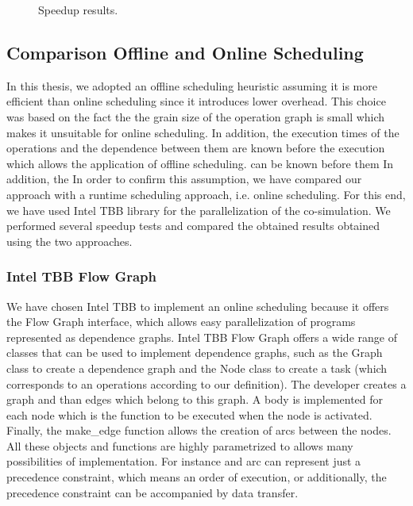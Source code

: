 \begin{figure}[phbt]
\centering

\caption{Speedup results.}
\label{fig:spdup}
\end{figure}  

\subsection{Comparison Offline and Online Scheduling}

In this thesis, we adopted an offline scheduling heuristic assuming it is more efficient than online scheduling since it introduces lower overhead. This choice was based on the fact the the grain size of the operation graph is small which makes it unsuitable for online scheduling. In addition, the execution times of the operations and the dependence between them are known before the execution which allows the application of offline scheduling. can be known before them In addition, the In order to confirm this assumption, we have compared our approach with a runtime scheduling approach, i.e. online scheduling. For this end, we have used Intel TBB library for the parallelization of the co-simulation. We performed several speedup tests and compared the obtained results obtained using the two approaches.

\subsubsection{Intel TBB Flow Graph}

We have chosen Intel TBB to implement an online scheduling because it offers the Flow Graph interface, which allows easy parallelization of programs represented as dependence graphs. Intel TBB Flow Graph offers a wide range of classes that can be used to implement dependence graphs, such as the Graph class to create a dependence graph and the Node class to create a task (which corresponds to an operations according to our definition). The developer creates a graph and than edges which belong to this graph. A body is implemented for each node which is the function to be executed when the node is activated. Finally, the make\_edge function allows the creation of arcs between the nodes. All these objects and functions are highly parametrized to allows many possibilities of implementation. For instance and arc can represent just a precedence constraint, which means an order of execution, or additionally, the precedence constraint can be accompanied by data transfer.

